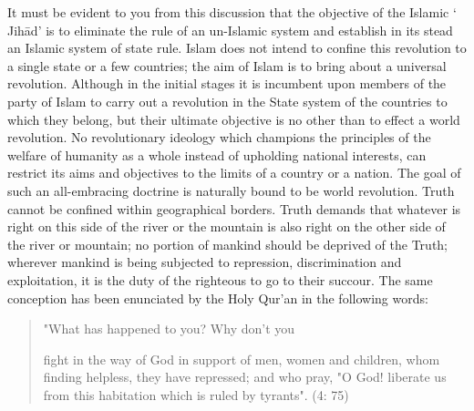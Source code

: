 It must be evident to you from this discussion that the objective of the
Islamic ` Jihād' is to eliminate the rule of an un-Islamic system and
establish in its stead an Islamic system of state rule. Islam does not
intend to confine this revolution to a single state or a few countries;
the aim of Islam is to bring about a universal revolution. Although in
the initial stages it is incumbent upon members of the party of Islam to
carry out a revolution in the State system of the countries to which
they belong, but their ultimate objective is no other than to effect a
world revolution. No revolutionary ideology which champions the
principles of the welfare of humanity as a whole instead of upholding
national interests, can restrict its aims and objectives to the limits
of a country or a nation. The goal of such an all-embracing doctrine is
naturally bound to be world revolution. Truth cannot be confined within
geographical borders. Truth demands that whatever is right on this side
of the river or the mountain is also right on the other side of the
river or mountain; no portion of mankind should be deprived of the
Truth; wherever mankind is being subjected to repression, discrimination
and exploitation, it is the duty of the righteous to go to their
succour. The same conception has been enunciated by the Holy Qur'an in
the following words:

\begin{quote}
"What has happened to you? Why don't you

fight in the way of God in support of men, women and children, whom
finding helpless, they have repressed; and who pray, "O God! liberate us
from this habitation which is ruled by tyrants". (4: 75)
\end{quote}

